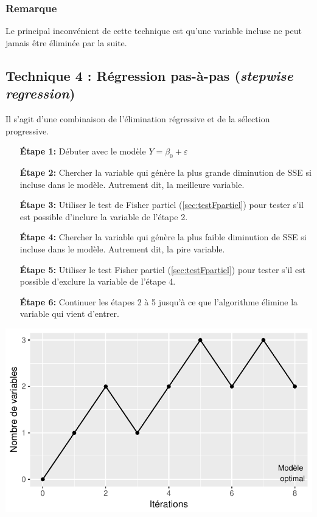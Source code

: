 \documentclass[11pt,french]{report}
\begin{document}
\subsubsection*{Remarque}
Le principal inconvénient de cette technique est qu'une variable incluse ne peut jamais être éliminée par la suite. 

\subsection{Technique 4 : Régression pas-à-pas (\emph{stepwise regression})}
\label{tech4}

Il s'agit d'une combinaison de l'élimination régressive et de la sélection progressive.

\begin{itemize}
\item [\textbf{Étape 1:}] Débuter avec le modèle $Y = \beta_0 + \varepsilon$

\item [\textbf{Étape 2:}] Chercher la variable qui génère la plus grande diminution de SSE si incluse dans le modèle. Autrement dit, la meilleure variable.

\item [\textbf{Étape 3:}] Utiliser le test de Fisher partiel (\ref{sec:testFpartiel}) pour tester s'il est possible d'inclure la variable de l'étape 2.

\item [\textbf{Étape 4:}] Chercher la variable qui génère la plus faible diminution de SSE si incluse dans le modèle. Autrement dit, la pire variable.

\item [\textbf{Étape 5:}] Utiliser le test Fisher partiel (\ref{sec:testFpartiel}) pour tester s'il est possible d'exclure la variable de l'étape 4.

\item [\textbf{Étape 6:}] Continuer les étapes 2 à 5 jusqu'à ce que l'algorithme élimine la variable qui vient d'entrer.
\end{itemize}
\bigskip

\includegraphics{notes_de_cours-027}
\end{document}
